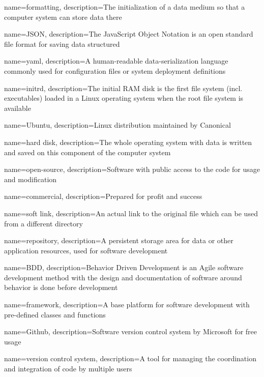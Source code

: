 {
    name={formatting},
    description={The initialization of a data medium so that a computer system can store data there}
}

{
    name={JSON},
    description={The JavaScript Object Notation is an open standard file format for saving data structured}
}

{
    name={yaml},
    description={A human-readable data-serialization language commonly used for configuration files or system deployment definitions}
}

{
    name={initrd},
    description={The initial RAM disk is the first file system (incl. executables) loaded in a Linux operating system when the root file system is available}
}

{
    name={Ubuntu},
    description={Linux distribution maintained by Canonical}
}

{
    name={hard disk},
    description={The whole operating system with data is written and saved on this component of the computer system}
}

{
    name={open-source},
    description={Software with public access to the code for usage and modification}
}

{
    name={commercial},
    description={Prepared for profit and success}
}

{
    name={soft link},
    description={An actual link to the original file which can be used from a different directory}
}

{
    name={repository},
    description={A persistent storage area for data or other application resources, used for software development}
}


{
    name={BDD},
    description={Behavior Driven Development is an Agile software development method with the design and documentation of software around behavior is done before development}
}

{
    name={framework},
    description={A base platform for software development with pre-defined classes and functions}
}


{
    name={Github},
    description={Software version control system by Microsoft for free usage}
}

{
    name={version control system},
    description={A tool for managing the coordination and integration of code by multiple users}
}


\glsaddall
